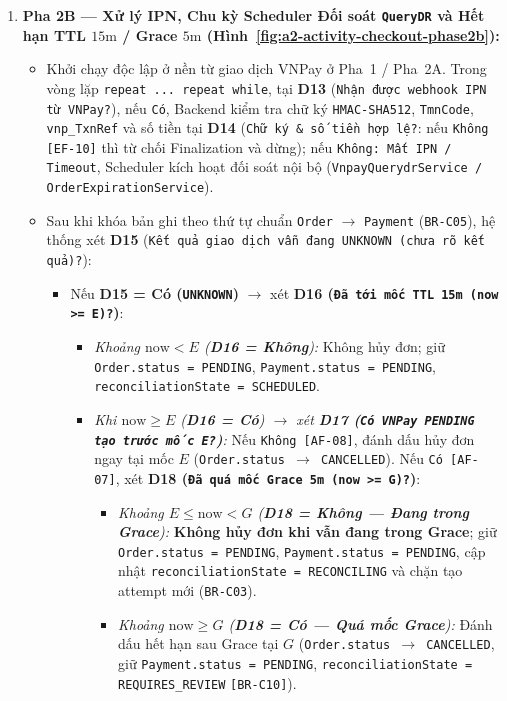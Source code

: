 \begin{enumerate}
  \item \textbf{Pha 2B --- Xử lý IPN, Chu kỳ Scheduler Đối soát \texttt{QueryDR} và Hết hạn TTL \(15\text{m}\) / Grace \(5\text{m}\) (Hình~\ref{fig:a2-activity-checkout-phase2b}):}
  \begin{itemize}
    \item Khởi chạy độc lập ở nền từ giao dịch VNPay ở Pha~1 / Pha~2A. Trong vòng lặp \texttt{repeat ... repeat while}, tại \textbf{D13} (\texttt{Nhận được webhook IPN từ VNPay?}), nếu \texttt{Có}, Backend kiểm tra chữ ký \texttt{HMAC-SHA512}, \texttt{TmnCode}, \texttt{vnp\_TxnRef} và số tiền tại \textbf{D14} (\texttt{Chữ ký \& số tiền hợp lệ?}: nếu \texttt{Không [EF-10]} thì từ chối Finalization và dừng); nếu \texttt{Không: Mất IPN / Timeout}, Scheduler kích hoạt đối soát nội bộ (\texttt{VnpayQuerydrService / OrderExpirationService}).
    \item Sau khi khóa bản ghi theo thứ tự chuẩn \texttt{Order} $\rightarrow$ \texttt{Payment} (\texttt{BR-C05}), hệ thống xét \textbf{D15} (\texttt{Kết quả giao dịch vẫn đang UNKNOWN (chưa rõ kết quả)?}):
    \begin{itemize}
      \item Nếu \textbf{D15 = Có (\texttt{UNKNOWN})} \(\rightarrow\) xét \textbf{D16 (\texttt{Đã tới mốc TTL 15m (now >= E)?})}:
      \begin{itemize}
        \item \emph{Khoảng \(\text{now} < E\) (\textbf{D16 = Không}):} Không hủy đơn; giữ \texttt{Order.status = PENDING}, \texttt{Payment.status = PENDING}, \texttt{reconciliationState = SCHEDULED}.
        \item \emph{Khi \(\text{now} \ge E\) (\textbf{D16 = Có}) \(\rightarrow\) xét \textbf{D17 (\texttt{Có VNPay PENDING tạo trước mốc E?})}:} Nếu \texttt{Không [AF-08]}, đánh dấu hủy đơn ngay tại mốc \(E\) (\texttt{Order.status \(\rightarrow\) CANCELLED}). Nếu \texttt{Có [AF-07]}, xét \textbf{D18 (\texttt{Đã quá mốc Grace 5m (now >= G)?})}:
        \begin{itemize}
          \item \emph{Khoảng \(E \le \text{now} < G\) (\textbf{D18 = Không --- Đang trong Grace}):} \textbf{Không hủy đơn khi vẫn đang trong Grace}; giữ \texttt{Order.status = PENDING}, \texttt{Payment.status = PENDING}, cập nhật \texttt{reconciliationState = RECONCILING} và chặn tạo attempt mới (\texttt{BR-C03}).
          \item \emph{Khoảng \(\text{now} \ge G\) (\textbf{D18 = Có --- Quá mốc Grace}):} Đánh dấu hết hạn sau Grace tại \(G\) (\texttt{Order.status \(\rightarrow\) CANCELLED}, giữ \texttt{Payment.status = PENDING}, \texttt{reconciliationState = REQUIRES\_REVIEW} \texttt{[BR-C10]}).

\end{itemize}
\end{itemize}
\end{itemize}
\end{itemize}
\end{enumerate}
